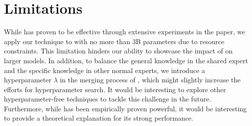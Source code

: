 \section*{Limitations}
While \ours has proven to be effective through extensive experiments in the paper, we apply our technique to  with no more than 3B parameters due to resource constraints. This limitation hinders our ability to showcase the impact of \ours on larger models. In addition, to balance the general knowledge in the shared expert and the specific knowledge in other normal experts, we introduce a hyperparameter $\lambda$ in the merging process of \ours, which might slightly increase the efforts for hyperparameter search. It would be interesting to explore other hyperparameter-free techniques to tackle this challenge in the future. Furthermore, while \ours has been empirically proven powerful, it would be interesting to provide a theoretical explanation for its strong performance.
